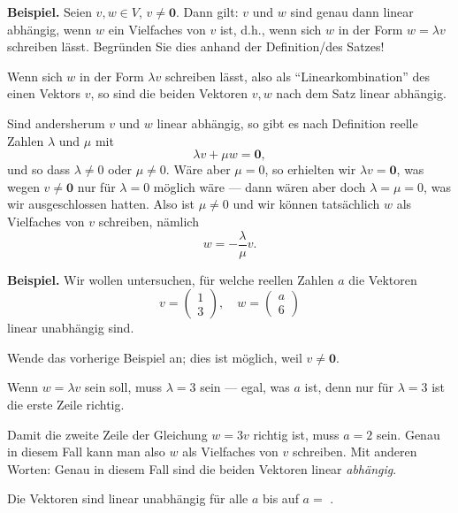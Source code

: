 \documentclass{ximera}
\begin{document}
\begin{question}
\textbf{Beispiel.} Seien $v, w\in V$, $v\ne \mathbf{0}$. Dann gilt: $v$ und $w$ sind genau dann linear abhängig, wenn $w$ ein Vielfaches von $v$ ist, d.h., wenn sich $w$ in der Form $w= \lambda v$ schreiben lässt. Begründen Sie dies anhand der Definition/des Satzes!
\begin{solution}
    \begin{free-response}
Wenn sich $w$ in der Form $\lambda v$ schreiben lässt, also als ``Linearkombination'' des einen Vektors $v$, so sind die beiden Vektoren $v, w$ nach dem Satz linear abhängig.

Sind andersherum $v$ und $w$ linear abhängig, so gibt es nach Definition reelle Zahlen $\lambda$ und $\mu$ mit
\[
\lambda v + \mu w = \mathbf{0},
\]
und so dass $\lambda\ne 0$ oder $\mu\ne 0$. Wäre aber $\mu = 0$, so erhielten wir $\lambda v = \mathbf{0}$, was wegen $v\ne\mathbf{0}$ nur für $\lambda=0$ möglich wäre --- dann wären aber doch $\lambda=\mu=0$, was wir ausgeschlossen hatten. Also ist $\mu \ne 0$ und wir können tatsächlich $w$ als Vielfaches von $v$ schreiben, nämlich
\[
w = -\frac{\lambda}{\mu} v.
\]
    \end{free-response}
\end{solution}
    
\end{question}

\begin{question}
\textbf{Beispiel.} Wir wollen untersuchen, für welche reellen Zahlen $a$ die Vektoren
\[
v = \left( \begin{array}{c}
1 \\ 3
\end{array} \right), \quad
w = \left( \begin{array}{c}
a \\ 6
\end{array} \right)
\]
linear unabhängig sind.
\begin{solution}
\begin{hint}
Wende das vorherige Beispiel an; dies ist möglich, weil $v\ne\mathbf{0}$.
\end{hint}
\begin{hint}
Wenn $w = \lambda v$ sein soll, muss $\lambda = 3$ sein --- egal, was $a$ ist, denn nur für $\lambda = 3$ ist die erste Zeile richtig.
\end{hint}
\begin{hint}
Damit die zweite Zeile der Gleichung $w = 3 v$ richtig ist, muss $a=2$ sein. Genau in diesem Fall kann man also $w$ als Vielfaches von $v$ schreiben. Mit anderen Worten: Genau in diesem Fall sind die beiden Vektoren linear \emph{abhängig}.
\end{hint}
Die Vektoren sind linear unabhängig für alle $a$ bis auf $a=$ .
\end{solution}
\end{question}
\end{document}
